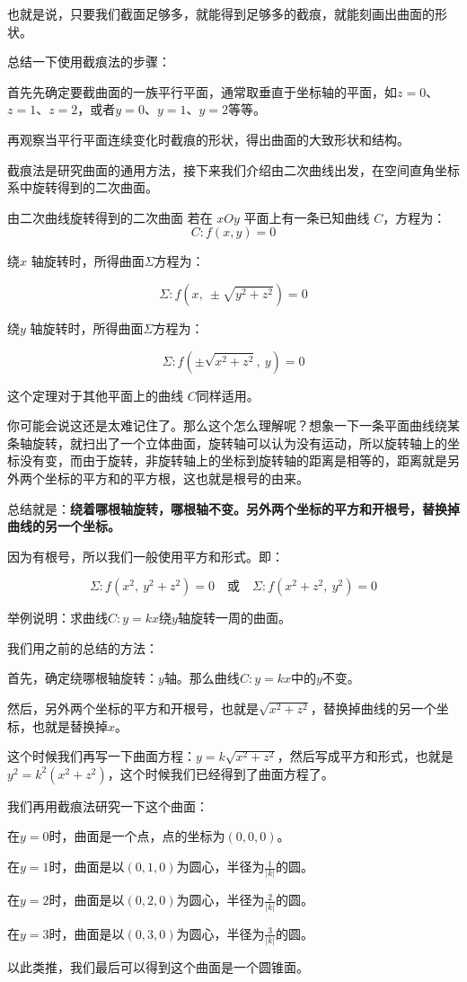 也就是说，只要我们截面足够多，就能得到足够多的截痕，就能刻画出曲面的形状。

总结一下使用截痕法的步骤：

首先先确定要截曲面的一族平行平面，通常取垂直于坐标轴的平面，如$z=0$、$z=1$、$z=2$，或者$y=0$、$y=1$、$y=2$等等。

再观察当平行平面连续变化时截痕的形状，得出曲面的大致形状和结构。

截痕法是研究曲面的通用方法，接下来我们介绍由二次曲线出发，在空间直角坐标系中旋转得到的二次曲面。

\begin{theorem}{由二次曲线旋转得到的二次曲面}{}
若在 \(xOy\) 平面上有一条已知曲线 \(C\)，方程为：
\[
C: f(x,y)=0
\]

绕\(x\) 轴旋转时，所得曲面$\Sigma $方程为：

\[
\Sigma: f(x,\ \pm\sqrt{y^2+z^2})=0
\]



绕\(y\) 轴旋转时，所得曲面$\Sigma $方程为：

\[
\Sigma: f(\pm\sqrt{x^2+z^2},\ y)=0
\]
\end{theorem}

这个定理对于其他平面上的曲线 \(C\)同样适用。

你可能会说这还是太难记住了。那么这个怎么理解呢？想象一下一条平面曲线绕某条轴旋转，就扫出了一个立体曲面，旋转轴可以认为没有运动，所以旋转轴上的坐标没有变，而由于旋转，非旋转轴上的坐标到旋转轴的距离是相等的，距离就是另外两个坐标的平方和的平方根，这也就是根号的由来。

总结就是：\textbf{绕着哪根轴旋转，哪根轴不变。另外两个坐标的平方和开根号，替换掉曲线的另一个坐标。}

因为有根号，所以我们一般使用平方和形式。即：

\[
\Sigma: f(x^2,\ y^2+z^2)=0 \quad \text{或} \quad \Sigma: f(x^2+z^2,\ y^2)=0
\]

\begin{myexample}
  举例说明：求曲线$C: y=kx$绕$y$轴旋转一周的曲面。

  我们用之前的总结的方法：

  首先，确定绕哪根轴旋转：$y$轴。那么曲线$C: y=kx$中的$y$不变。

  然后，另外两个坐标的平方和开根号，也就是$\sqrt{x^2+z^2}$，替换掉曲线的另一个坐标，也就是替换掉$x$。

  这个时候我们再写一下曲面方程：$y=k\sqrt{x^2+z^2}$，然后写成平方和形式，也就是$y^2=k^2(x^2+z^2)$，这个时候我们已经得到了曲面方程了。

  我们再用截痕法研究一下这个曲面：

  在$y=0$时，曲面是一个点，点的坐标为$(0,0,0)$。

  在$y=1$时，曲面是以$(0,1,0)$为圆心，半径为$\frac{1}{|k|}$的圆。

  在$y=2$时，曲面是以$(0,2,0)$为圆心，半径为$\frac{2}{|k|}$的圆。

  在$y=3$时，曲面是以$(0,3,0)$为圆心，半径为$\frac{3}{|k|}$的圆。

  以此类推，我们最后可以得到这个曲面是一个圆锥面。
\end{myexample}

